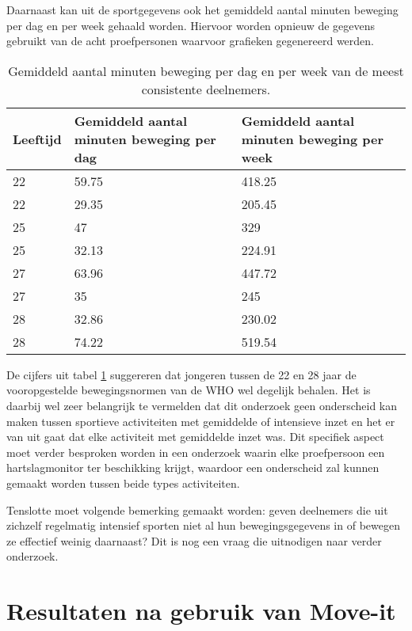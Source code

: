 Daarnaast kan uit de sportgegevens ook het gemiddeld aantal minuten beweging per dag en per week gehaald worden. Hiervoor worden opnieuw de gegevens gebruikt van de acht proefpersonen waarvoor grafieken gegenereerd werden.

\begin{table}[h]
    \caption[Gemiddeld aantal minuten beweging per dag en per week]{Gemiddeld aantal minuten beweging per dag en per week van de meest consistente deelnemers.}
    \centering
    \label{table:gemiddeldes}
\begin{tabular}{||m{.2\linewidth} m{.4\linewidth} m{.4\linewidth}||}
    \hline
    Leeftijd & Gemiddeld aantal minuten beweging per dag & Gemiddeld aantal minuten beweging per week \\ [0.5ex]
    \hline\hline
    22 & 59.75 & 418.25 \\
    22 & 29.35 & 205.45 \\
    25 & 47 & 329 \\
    25 & 32.13 & 224.91 \\
    27 & 63.96 & 447.72 \\
    27 & 35 & 245 \\
    28 & 32.86 & 230.02 \\
    28 & 74.22 & 519.54 \\ [1ex]
    \hline
\end{tabular}
\end{table}

De cijfers uit tabel \ref{table:gemiddeldes} suggereren dat jongeren tussen de 22 en 28 jaar de vooropgestelde bewegingsnormen van de WHO wel degelijk behalen.
Het is daarbij wel zeer belangrijk te vermelden dat dit onderzoek geen onderscheid kan maken tussen sportieve activiteiten met gemiddelde of intensieve inzet en het er van uit gaat dat elke activiteit met gemiddelde inzet was. Dit specifiek aspect moet verder besproken worden in een onderzoek waarin elke proefpersoon een hartslagmonitor ter beschikking krijgt, waardoor een onderscheid zal kunnen gemaakt worden tussen beide types activiteiten.

Tenslotte moet volgende bemerking gemaakt worden: geven deelnemers die uit zichzelf regelmatig intensief sporten niet al hun bewegingsgegevens in of bewegen ze effectief weinig daarnaast? Dit is nog een vraag die uitnodigen naar verder onderzoek.

\section{Resultaten na gebruik van Move-it}

